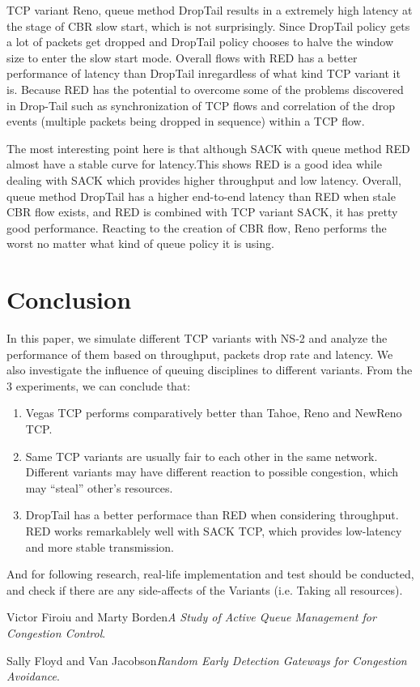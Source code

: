 \documentclass[10pt, conference]{lib/IEEEtran}
\begin{document}
TCP variant Reno, queue method DropTail results in a extremely high latency at the stage of CBR slow start, which is not surprisingly. Since DropTail policy gets a lot of packets get dropped and DropTail policy chooses to halve the window size to enter the slow start mode. Overall flows with RED has a better performance of latency than DropTail inregardless of what kind TCP variant it is. Because RED has the potential to overcome some of the problems discovered in Drop-Tail such as synchronization of TCP flows and correlation of the drop events (multiple packets being dropped in sequence) within a TCP flow.

The most interesting point here is that although SACK with queue method RED almost have a stable curve for latency.This shows RED is a good idea while dealing with SACK which provides higher throughput and low latency. Overall, queue method DropTail has a higher end-to-end latency than RED when stale CBR flow exists, and RED is combined with TCP variant SACK, it has pretty good performance. Reacting to the creation of CBR flow, Reno performs the worst no matter what kind of queue policy it is using.\\

\section{Conclusion}
In this paper, we simulate different TCP variants with NS-2 and analyze the performance of them based on throughput, packets 
drop rate and latency. We also investigate the influence of queuing disciplines to different variants. From the 3 experiments, 
we can conclude that:
\begin{enumerate}
    \item Vegas TCP performs comparatively better than Tahoe, Reno and NewReno TCP.
    \item Same TCP variants are usually fair to each other in the same network. Different variants may have different reaction to possible
    congestion, which may ``steal'' other's resources. 
    \item DropTail has a better performace than RED when considering throughput. RED works remarkablely well with SACK TCP, which provides low-latency and more stable transmission.
\end{enumerate}
And for following research, real-life implementation and test should 
be conducted, and check if there are any side-affects of the Variants
(i.e. Taking all resources).

\begin{thebibliography}{1}

Victor Firoiu and Marty Borden\emph{A Study of Active Queue Management for Congestion Control}.

Sally Floyd and Van Jacobson\emph{Random Early Detection Gateways for Congestion Avoidance}.

\end{thebibliography}
\end{document}
